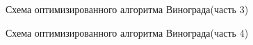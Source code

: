 \begin{figure}
\caption{Схема оптимизированного алгоритма Винограда(часть 3)}
\label{fig:vinOpt3}
\end{figure}

\begin{figure}
\caption{Схема оптимизированного алгоритма Винограда(часть 4)}
\label{fig:vinOpt4}
\end{figure}